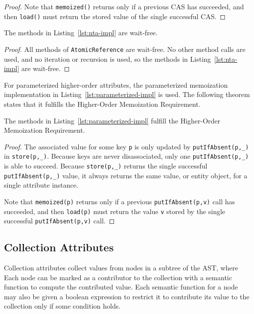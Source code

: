{\begin{proof}
  Note that \verb'memoized()' returns \true{} only if a previous CAS has succeeded,
  and then \verb'load()' must return the stored value of the single successful CAS.
\end{proof}

\begin{theorem}
  The methods in Listing~\ref{lst:nta-impl} are wait-free.
\end{theorem}

\begin{proof}
  All methods of \verb'AtomicReference' are wait-free. No other method calls are used,
  and no iteration or recursion is used,
  so the methods in Listing~\ref{lst:nta-impl} are wait-free.
\end{proof}

For parameterized higher-order attributes, the parameterized memoization
implementation in Listing~\ref{lst:parameterized-impl} is used.  The following
theorem states that it fulfills the Higher-Order Memoization Requirement.

\begin{theorem}
  The methods in Listing~\ref{lst:parameterized-impl} fulfill the
  Higher-Order Memoization Requirement.

  \label{theorem:param-nta-sound}
\end{theorem}

\begin{proof}
  The associated value for some key \verb'p' is only updated by \verb'putIfAbsent(p,_)' in
  \verb'store(p,_)'.  Because keys are never disassociated, only one \verb'putIfAbsent(p,_)'
  is able to succeed.
  Because \verb'store(p,_)' returns the single
  successful \verb'putIfAbsent(p,_)' value,
  it always returns the same value, or entity object, for a single attribute instance.

  Note that \verb'memoized(p)' returns \true{} only if a previous \verb'putIfAbsent(p,v)'
  call has succeeded,
  and then \verb'load(p)' must return the value \verb'v' stored by the single successful \verb'putIfAbsent(p,v)'
  call.
\end{proof}


\subsection{Collection Attributes}
\label{coll-compute}

Collection attributes collect values from nodes in a subtree of the AST, where
Each node can be
marked as a contributor to the collection with a semantic function to compute the contributed
value.  Each semantic function for a node may also be given a boolean expression to restrict it to
contribute its value to the collection only if some condition holds.

}
